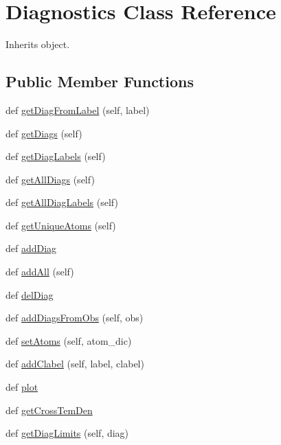 \hypertarget{classpyneb_1_1core_1_1diags_1_1_diagnostics}{}\section{Diagnostics Class Reference}
\label{classpyneb_1_1core_1_1diags_1_1_diagnostics}


Inherits object.

\subsection*{Public Member Functions}
\begin{DoxyCompactItemize}
\item 
def \hyperlink{classpyneb_1_1core_1_1diags_1_1_diagnostics_a6c37ac8955746c00c750d56627364110}{get\+Diag\+From\+Label} (self, label)
\item 
def \hyperlink{classpyneb_1_1core_1_1diags_1_1_diagnostics_ac31e69b1cfddac42cf34d25e804475ae}{get\+Diags} (self)
\item 
def \hyperlink{classpyneb_1_1core_1_1diags_1_1_diagnostics_a364a9b1e393f16d9ea3434e803568f8f}{get\+Diag\+Labels} (self)
\item 
def \hyperlink{classpyneb_1_1core_1_1diags_1_1_diagnostics_a3501e26777972df99ea26b539780eddd}{get\+All\+Diags} (self)
\item 
def \hyperlink{classpyneb_1_1core_1_1diags_1_1_diagnostics_a63017c62b24c56f2baf54aa565743438}{get\+All\+Diag\+Labels} (self)
\item 
def \hyperlink{classpyneb_1_1core_1_1diags_1_1_diagnostics_afed5c14d1afc82e372b10417b942fe68}{get\+Unique\+Atoms} (self)
\item 
def \hyperlink{classpyneb_1_1core_1_1diags_1_1_diagnostics_a5ef93e4268f3ac7fc1f1215225d29347}{add\+Diag}
\item 
def \hyperlink{classpyneb_1_1core_1_1diags_1_1_diagnostics_af3ae155409bcf4807ade0aa0990420de}{add\+All} (self)
\item 
def \hyperlink{classpyneb_1_1core_1_1diags_1_1_diagnostics_a60f87567624b2ebc5405dadff8faf566}{del\+Diag}
\item 
def \hyperlink{classpyneb_1_1core_1_1diags_1_1_diagnostics_a6a33eaad047cabb02d2084dd4d7be05a}{add\+Diags\+From\+Obs} (self, obs)
\item 
def \hyperlink{classpyneb_1_1core_1_1diags_1_1_diagnostics_aa4ba04cc0eac1f34dd3baa1fc9e074c5}{set\+Atoms} (self, atom\+\_\+dic)
\item 
def \hyperlink{classpyneb_1_1core_1_1diags_1_1_diagnostics_a4282f3f51e1dc3bdd3f67543ac377de3}{add\+Clabel} (self, label, clabel)
\item 
def \hyperlink{classpyneb_1_1core_1_1diags_1_1_diagnostics_ab0394ec3bced7aafedc829f80d3d95f5}{plot}
\item 
def \hyperlink{classpyneb_1_1core_1_1diags_1_1_diagnostics_aba2575230391bf6d96ef2a5dbae6853f}{get\+Cross\+Tem\+Den}
\item 
def \hyperlink{classpyneb_1_1core_1_1diags_1_1_diagnostics_a2d6c8e9ea2988c040ee9dcdf189d417c}{get\+Diag\+Limits} (self, diag)
\end{DoxyCompactItemize}
